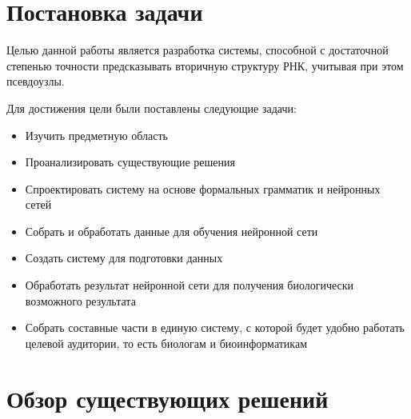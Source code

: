 \documentclass[14pt]{matmex-diploma-custom}
\begin{document}
\section{Постановка задачи}
Целью данной работы является разработка системы, способной с достаточной степенью точности предсказывать вторичную структуру РНК, учитывая при этом псевдоузлы. \par 
Для достижения цели были поставлены следующие задачи:
\begin{itemize}
	\item Изучить предметную область
	\item Проанализировать существующие решения
	\item Спроектировать систему на основе формальных грамматик и нейронных сетей
	\item Собрать и обработать данные для обучения нейронной сети
	\item Создать систему для подготовки данных
	\item Обработать результат нейронной сети для получения биологически возможного результата
	\item Собрать составные части в единую систему, с которой будет удобно работать целевой аудитории, то есть биологам и биоинформатикам
\end{itemize}
\section{Обзор существующих решений}
\end{document}
